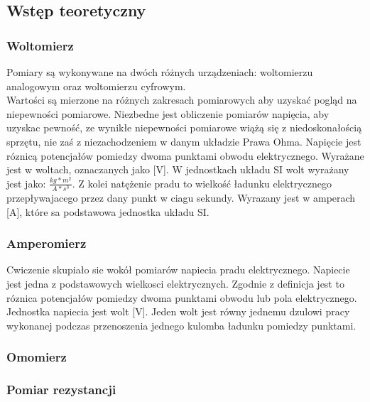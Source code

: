 \documentclass[a4paper,13pt]{extarticle}  %
\begin{document}
        \subsection{Wstęp teoretyczny}
            \subsubsection{Woltomierz}
                Pomiary są wykonywane na dwóch różnych urządzeniach: woltomierzu analogowym oraz woltomierzu cyfrowym.\\
                Wartości są mierzone na różnych zakresach pomiarowych aby uzyskać pogląd na niepewności pomiarowe.
                Niezbedne jest obliczenie pomiarów napięcia, aby uzyskac pewność, ze wynikłe niepewności pomiarowe wiążą się z niedoskonałością sprzętu,
                nie zaś z niezachodzeniem w danym układzie Prawa Ohma. 
                Napięcie jest róznicą potencjałów pomiedzy dwoma punktami obwodu elektrycznego. 
                Wyrażane jest w woltach, oznaczanych jako [V]. 
                W jednostkach układu SI wolt wyrażany jest jako: $\frac{kg \ast m^2}{A \ast s^3}$.
                Z kolei natężenie pradu to wielkość ładunku elektrycznego przepływajacego
                przez dany punkt w ciagu sekundy. Wyrazany jest w amperach [A], 
                które sa podstawowa jednostka układu SI.
                \subsubsection{Amperomierz}
                Cwiczenie skupiało sie wokół pomiarów napiecia pradu elektrycznego.
                Napiecie jest jedna z podstawowych wielkosci elektrycznych.
                Zgodnie z definicja jest to róznica potencjałów pomiedzy dwoma punktami obwodu lub pola elektrycznego. 
                Jednostka napiecia jest wolt [V]. 
                Jeden wolt jest równy jednemu dzulowi pracy wykonanej podczas przenoszenia jednego kulomba ładunku pomiedzy punktami.
            \subsubsection{Omomierz}

            \subsubsection{Pomiar rezystancji}
\end{document}
